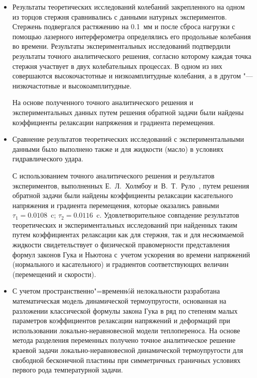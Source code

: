 \begin{itemize}
\item[5.]  Результаты теоретических исследований колебаний закрепленного на одном из торцов стержня сравнивались с данными натурных экспериментов. Стержень подвергался растяжению на 0.1~мм и после сброса нагрузки с помощью лазерного интерферометра определялись его продольные колебания во времени. Результаты экспериментальных исследований подтвердили результаты точного аналитического решения, согласно которому каждая точка стержня участвует в двух колебательных процессах. В одном из них совершаются высокочастотные и низкоамплитудные колебания, а в другом "--- низкочастотные и высокоамплитудные. 

На основе полученного точного аналитического решения и экспериментальных данных  путем решения обратной задачи были найдены коэффициенты релаксации напряжения и градиента перемещения.



\item[6.] Сравнение результатов теоретических исследований с экспериментальными данными было выполнено также и для жидкости (масло) в условиях гидравлического удара. 

С использованием точного аналитического решения и результатов экспериментов, выполненных Е.~Л.~Холмбоу и~В.~Т.~Руло~\cite{kud:bib16}, путем решения обратной задачи были найдены коэффициенты релаксации касательного напряжения и градиента перемещения, которые оказались равными $\tau_1 =0.0108$~c; $\tau _2 =0.0116$~c. Удовлетворительное совпадение результатов теоретических и экспериментальных исследований при найденных таким путем коэффициентах релаксации как для стержня, так и для несжимаемой жидкости  свидетельствует о физической правомерности представления формул законов Гука и Ньютона с~учетом ускорения во времени напряжений (нормального и касательного) и градиентов соответствующих величин (перемещений и скорости).



\item[7.] С учетом пространственно"=временн\'{o}й нелокальности разработана математическая модель динамической термоупругости, основанная на разложении классической формулы закона Гука в ряд по степеням малых параметров коэффициентов релаксации напряжений и деформаций при использовании локально-неравновесной модели теплопереноса. На основе метода разделения переменных  получено точное аналитическое решение краевой задачи локально-неравновесной динамической термоупругости для свободной бесконечной пластины при симметричных граничных условиях первого рода температурной задачи.





\end{itemize}




